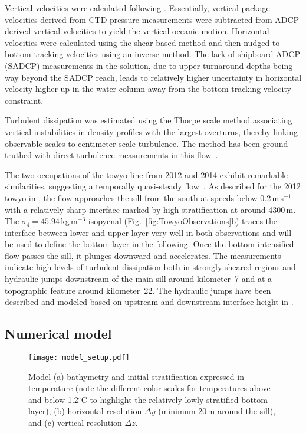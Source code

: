 \documentclass{ametsocV6.1}
\begin{document}
Vertical velocities were calculated following \citet{thurnherretal15}.
Essentially, vertical package velocities derived from CTD pressure measurements were subtracted from ADCP-derived vertical velocities to yield the vertical oceanic motion.
Horizontal velocities were calculated using the shear-based method \citep{fischervisbeck93} and then nudged to bottom tracking velocities using an inverse method.
The lack of shipboard ADCP (SADCP) measurements in the solution, due to upper turnaround depths being way beyond the SADCP reach, leads to relatively higher uncertainty in horizontal velocity higher up in the water column away from the bottom tracking velocity constraint.   

Turbulent dissipation was estimated using the Thorpe scale method \citep{thorpe77, dillon82, ferronetal98} associating vertical instabilities in density profiles with the largest overturns, thereby linking observable scales to centimeter-scale turbulence.
The method has been ground-truthed with direct turbulence measurements in this flow~\citep{voetetal15}.

The two occupations of the towyo line from 2012 and 2014 exhibit remarkable similarities, suggesting a temporally quasi-steady flow~\citep{cusacketal19}.
As described for the 2012 towyo in \citet{alfordetal13c}, the flow approaches the sill from the south at speeds below 0.2\,m\,s$^{-1}$ with a relatively sharp interface marked by high stratification at around 4300\,m.
The $\sigma_4=45.94$\,kg\,m$^{-3}$ isopycnal (Fig.~\ref{fig:TowyoObservations}b) traces the interface between lower and upper layer very well in both observations and will be used to define the bottom layer in the following.
Once the bottom-intensified flow passes the sill, it plunges downward and accelerates.
The measurements indicate high levels of turbulent dissipation both in strongly sheared regions and hydraulic jumps downstream of the main sill around kilometer~7 and at a topographic feature around kilometer~22.
The hydraulic jumps have been described and modeled based on upstream and downstream interface height in \citet{thorpeetal18}.

\subsection{Numerical model}\label{sec:Model}

\begin{figure*}
\centerline{\texttt{[image: model\_setup.pdf]}}
\caption{
Model (a) bathymetry and initial stratification expressed in temperature (note the different color scales for temperatures above and below 1.2$^{\circ}$C to highlight the relatively lowly stratified bottom layer), (b) horizontal resolution $\Delta y$ (minimum 20\,m around the sill), and (c) vertical resolution $\Delta z$.
}
\label{fig:ModelBasics}
\end{figure*}
\end{document}
